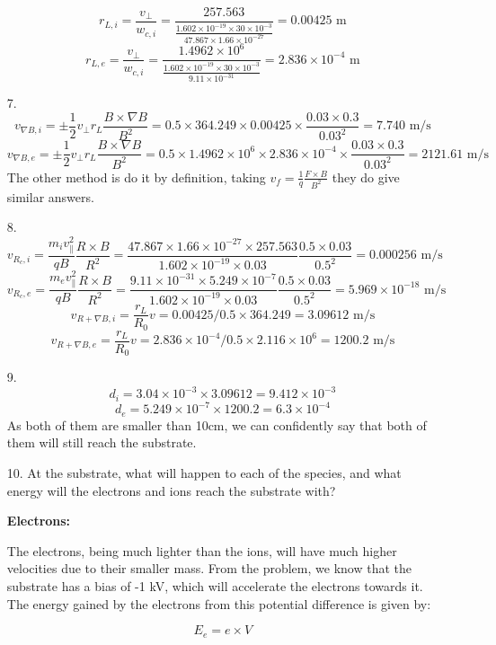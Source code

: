 \documentclass{article}
\begin{document}
\begin{itemize}
    \[r_{L,i} = \frac{v_{\bot}}{w_{c,i}} = \frac{257.563}{\frac{1.602\times 10^{-19}\times 30\times 10^{-3}}{47.867\times 1.66\times 10^{-27}}}=0.00425 \text{ m}\]
    \[r_{L,e} = \frac{v_{\bot}}{w_{c,i}} = \frac{1.4962\times 10 ^6}{\frac{1.602\times 10^{-19}\times 30\times 10^{-3}}{9.11\times 10^{-31}}}=2.836\times 10^{-4}\text{ m}\]
    \item[7.]
    \[v_{\nabla B,i} = \pm \frac{1}{2}v_{\bot }r_L \frac{B\times \nabla B}{B^2}=0.5\times 364.249\times 0.00425 \times \frac{0.03\times 0.3}{0.03^2} = 7.740 \text{ m/s}\]
    \[v_{\nabla B,e} = \pm \frac{1}{2}v_{\bot }r_L \frac{B\times \nabla B}{B^2}=0.5\times 1.4962\times 10 ^6\times 2.836\times 10^{-4} \times \frac{0.03\times 0.3}{0.03^2} = 2121.61 \text{ m/s}\]
    The other method is do it by definition, taking \(v_f = \frac{1}{q}\frac{F\times B}{B^2}\) they do give similar answers.
    \item[8.]
    \[v_{R_c,i} = \frac{m_i v_{\parallel}^2}{qB}\frac{R\times B}{R^2} = \frac{47.867\times 1.66\times 10^{-27}\times257.563}{1.602\times 10^{-19}\times 0.03}\frac{0.5\times 0.03}{0.5^2} = 0.000256 \text{ m/s}\]
    \[v_{R_c,e} = \frac{m_e v_{\parallel}^2}{qB}\frac{R\times B}{R^2} = \frac{9.11\times 10^{-31}\times5.249\times 10^{-7}}{1.602\times 10^{-19}\times 0.03}\frac{0.5\times 0.03}{0.5^2} = 5.969\times 10^{-18} \text{ m/s}\]
    \[v_{R+\nabla B,i} = \frac{r_L}{R_0}v = 0.00425/0.5 \times 364.249 = 3.09612\text{ m/s}\]
    \[v_{R+\nabla B,e} = \frac{r_L}{R_0}v = 2.836\times 10^{-4}/0.5 \times 2.116\times 10^6 = 1200.2\text{ m/s}\]
    \item[9.]
    \[d_i  = 3.04 \times 10^{-3} \times 3.09612 = 9.412\times 10^{-3}\]
    \[d_e  =  5.249\times 10^{-7} \times 1200.2 = 6.3 \times 10^{-4}\]
    As both of them are smaller than 10cm, we can confidently say that both of them will still reach the substrate.
    \newpage
    \item[10.]
    At the substrate, what will happen to each of the species, and what energy will the electrons and ions reach the substrate with?

\textbf{Electrons:}

The electrons, being much lighter than the ions, will have much higher velocities due to their smaller mass. From the problem, we know that the substrate has a bias of -1 kV, which will accelerate the electrons towards it. The energy gained by the electrons from this potential difference is given by:

\[
E_e = e \times V
\]


\end{itemize}
\end{document}
